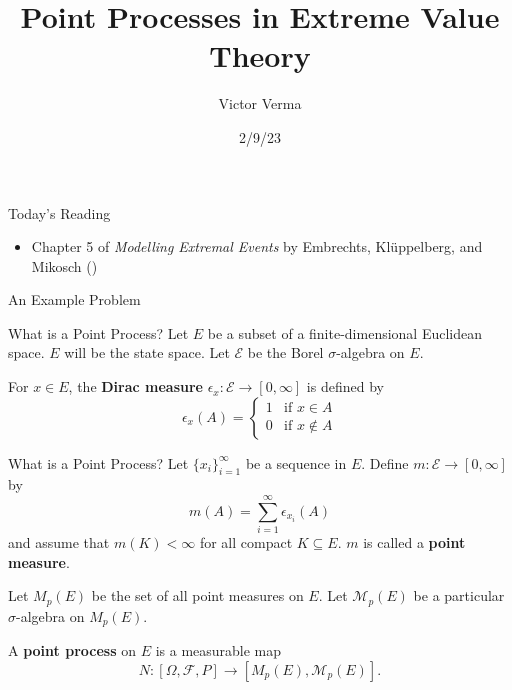 \documentclass{beamer}
\title[Point Processes in Extreme Value Theory]{Point Processes in Extreme Value Theory}
\author{Victor Verma}
\institute[]
{
Prof. Yang Chen's Reading Group \\
Department of Statistics \\
University of Michigan
}
\date[2/9/23]{2/9/23}
\begin{document}
\begin{frame}
    \titlepage
\end{frame}

\begin{frame}{Today's Reading}
    \begin{itemize}
        \item Chapter 5 of \textit{Modelling Extremal Events} by Embrechts, Kl\"{u}ppelberg, and Mikosch (\cite{embrechts_et_al_1997})
    \end{itemize}
\end{frame}


\begin{frame}{An Example Problem}
\end{frame}

\begin{frame}{What is a Point Process?}
    Let $E$ be a subset of a finite-dimensional Euclidean space. $E$ will be the state space. Let $\mathcal{E}$ be the Borel $\sigma$-algebra on $E$.

    \smallskip

    For $x \in E$, the \textbf{Dirac measure} $\epsilon_x : \mathcal{E} \to [0, \infty]$ is defined by
    \[
    \epsilon_x(A) =
        \begin{cases}
             1 & \text{if $x \in A$} \\
             0 & \text{if $x \notin A$}
        \end{cases}
    \]
\end{frame}

\begin{frame}{What is a Point Process?}
    Let $\{x_i\}_{i = 1}^{\infty}$ be a sequence in $E$. Define $m : \mathcal{E} \to [0, \infty]$ by
    \[
    m(A) = \sum_{i = 1}^{\infty} \epsilon_{x_i}(A)
    \]
    and assume that $m(K) < \infty$ for all compact $K \subseteq E$. $m$ is called a \textbf{point measure}.

    \smallskip

    Let $M_p(E)$ be the set of all point measures on $E$. Let $\mathcal{M}_p(E)$ be a particular $\sigma$-algebra on $M_p(E)$.

    \smallskip

    A \textbf{point process} on $E$ is a measurable map
    \[
    N : [\Omega, \mathcal{F}, P] \to [M_p(E), \mathcal{M}_p(E)].
    \]
\end{frame}
\end{document}
